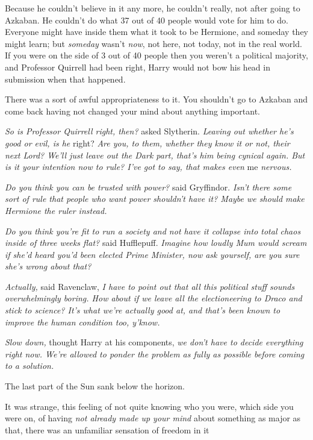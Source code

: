 Because he couldn't believe in it any more, he couldn't really, not after going
to Azkaban. He couldn't do what 37 out of 40 people would vote for him to do.
Everyone might have inside them what it took to be Hermione, and someday they
might learn; but \emph{someday} wasn't \emph{now}, not here, not today, not in
the real world. If you were on the side of 3 out of 40 people then you weren't
a political majority, and Professor Quirrell had been right, Harry would not
bow his head in submission when that happened.

There was a sort of awful appropriateness to it. You shouldn't go to Azkaban
and come back having not changed your mind about anything important.

\emph{So is Professor Quirrell right, then?} asked Slytherin. \emph{Leaving out
whether he's good or evil, is he} right? \emph{Are you, to them, whether they
know it or not, their next Lord? We'll just leave out the Dark part, that's him
being cynical again. But is it your intention now to rule? I've got to say,
that makes even} me \emph{nervous.}

\emph{Do you think you can be trusted with power?} said Gryffindor. \emph{Isn't
there some sort of rule that people who want power shouldn't have it? Maybe we
should make Hermione the ruler instead.}

\emph{Do you think you're fit to run a society and not have it collapse into
total chaos inside of three weeks flat?} said Hufflepuff. \emph{Imagine how
loudly Mum would scream if she'd heard you'd been elected Prime Minister, now
ask yourself, are you sure she's wrong about that?}

\emph{Actually,} said Ravenclaw, \emph{I have to point out that all this
political stuff sounds overwhelmingly boring. How about if we leave all the
electioneering to Draco and stick to science? It's what we're actually good at,
and that's been known to improve the human condition too, y'know.}

\emph{Slow down,} thought Harry at his components, \emph{we don't have to
decide everything right now. We're allowed to ponder the problem as fully as
possible before coming to a solution.}

The last part of the Sun sank below the horizon.

It was strange, this feeling of not quite knowing who you were, which side you
were on, of having \emph{not already made up your mind} about something as
major as that, there was an unfamiliar sensation of freedom in it{\el}

